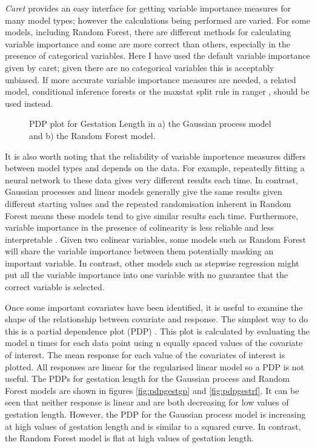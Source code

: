 \documentclass[10pt,]{article}
\begin{document}
\emph{Caret} provides an easy interface for getting variable importance measures for many model types; however the calculations being performed are varied.
For some models, including Random Forest, there are different methods for calculating variable importance \citep{oppel2009alternative, seifert2019surrogate} and some are more correct than others, especially in the presence of categorical variables.
Here I have used the default variable importance given by caret; given there are no categorical variables this is acceptably unbiased.
If more accurate variable importance measures are needed, a related model, conditional inference forests \citep{hothorn2006unbiased} or the maxstat split rule in ranger \citep{wright2017unbiased}, should be used instead.


\begin{figure}[t!]
  \centering

  \label{fig:pdp}
  \caption{
    PDP plot for Gestation Length in a) the Gaussian process model and b) the Random Forest model.
  }
\end{figure}

It is also worth noting that the reliability of variable importence measures differs between model types and depends on the data.
For example, repeatedly fitting a neural network to these data gives very different results each time.
In contrast, Gaussian processes and linear models generally give the same results given different starting values and the repeated randomisation inherent in Random Forest means these models tend to give similar results each time.
Furthermore, variable importance in the presence of colinearity is less reliable and less interpretable \citep{dormann2013collinearity}.
Given two colinear variables, some models such as Random Forest will share the variable importance between them potentially masking an important variable.
In contrast, other models such as stepwise regression might put all the variable importance into one variable with no guarantee that the correct variable is selected.

Once some important covariates have been identified, it is useful to examine the shape of the relationship between covariate and response.
The simplest way to do this is a partial dependence plot (PDP) \citep{friedman2001greedy}.
This plot is calculated by evaluating the model n times for each data point using n equally spaced values of the covariate of interest.
The mean response for each value of the covariates of interest is plotted.
All responses are linear for the regularised linear model so a PDP is not useful.
The PDPs for gestation length for the Gaussian process and Random Forest models are shown in figures \ref{fig:pdpgestgp} and \ref{fig:pdpgestrf}.
It can be seen that neither response is linear and are both decreasing for low values of gestation length.
However, the PDP for the Gaussian process model is increasing at high values of gestation length and is similar to a squared curve.
In contrast, the Random Forest model is flat at high values of gestation length.
\end{document}
